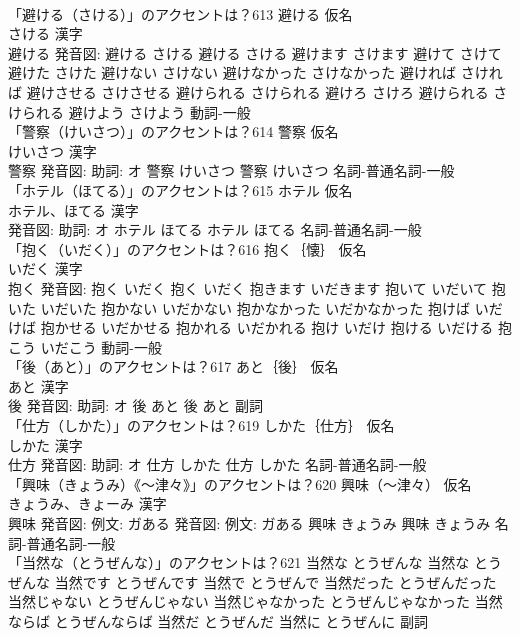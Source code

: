 \documentclass[8pt]{extreport}
\begin{document}
\begin{CJK}{UTF8}{min}
\\	「避ける（さける）」のアクセントは？613	避ける 仮名　
\\	さける 漢字　
\\	避ける 発音図:	避ける さける		避ける さける 避けます さけます 避けて さけて 避けた さけた 避けない さけない 避けなかった さけなかった 避ければ さければ 避けさせる さけさせる 避けられる さけられる 避けろ さけろ 避けられる さけられる 避けよう さけよう				動詞-一般 
\\	「警察（けいさつ）」のアクセントは？614	警察 仮名　
\\	けいさつ 漢字　
\\	警察 発音図: 助詞: オ	警察 けいさつ		警察 けいさつ				名詞-普通名詞-一般 
\\	「ホテル（ほてる）」のアクセントは？615	ホテル 仮名　
\\	ホテル、ほてる 漢字　
\\	発音図: 助詞: オ	ホテル ほてる		ホテル ほてる				名詞-普通名詞-一般 
\\	「抱く（いだく）」のアクセントは？616	抱く｛懐｝ 仮名　
\\	いだく 漢字　
\\	抱く 発音図:	抱く いだく		抱く いだく 抱きます いだきます 抱いて いだいて 抱いた いだいた 抱かない いだかない 抱かなかった いだかなかった 抱けば いだけば 抱かせる いだかせる 抱かれる いだかれる 抱け いだけ 抱ける いだける 抱こう いだこう				動詞-一般 
\\	「後（あと）」のアクセントは？617	あと｛後｝ 仮名　
\\	あと 漢字　
\\	後 発音図: 助詞: オ	後 あと		後 あと				副詞 
\\	「仕方（しかた）」のアクセントは？619	しかた｛仕方｝ 仮名　
\\	しかた 漢字　
\\	仕方 発音図: 助詞: オ	仕方 しかた		仕方 しかた				名詞-普通名詞-一般 
\\	「興味（きょうみ）《〜津々》」のアクセントは？620	興味（〜津々） 仮名　
\\	きょうみ、きょーみ 漢字　
\\	興味 発音図: 例文: ガある 発音図: 例文: ガある	興味 きょうみ		興味 きょうみ				名詞-普通名詞-一般 
\\	「当然な（とうぜんな）」のアクセントは？621		当然な とうぜんな		当然な とうぜんな 当然です とうぜんです 当然で とうぜんで 当然だった とうぜんだった 当然じゃない とうぜんじゃない 当然じゃなかった とうぜんじゃなかった 当然ならば とうぜんならば 当然だ とうぜんだ 当然に とうぜんに				副詞 

\end{CJK}
\end{document}
